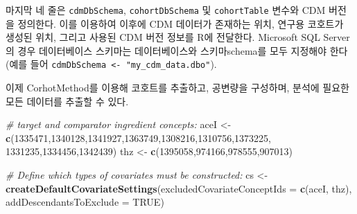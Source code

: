 \documentclass[10.5pt]{book}
\newenvironment{Shaded}{\begin{snugshade}}{\end{snugshade}}
\newcommand{\KeywordTok}[1]{\textcolor[rgb]{0.13,0.29,0.53}{\textbf{#1}}}
\newcommand{\DataTypeTok}[1]{\textcolor[rgb]{0.13,0.29,0.53}{#1}}
\newcommand{\DecValTok}[1]{\textcolor[rgb]{0.00,0.00,0.81}{#1}}
\newcommand{\StringTok}[1]{\textcolor[rgb]{0.31,0.60,0.02}{#1}}
\newcommand{\CommentTok}[1]{\textcolor[rgb]{0.56,0.35,0.01}{\textit{#1}}}
\newcommand{\OtherTok}[1]{\textcolor[rgb]{0.56,0.35,0.01}{#1}}
\newcommand{\NormalTok}[1]{#1}
\theoremstyle{definition}
\theoremstyle{definition}
\theoremstyle{definition}
\theoremstyle{remark}
\begin{document}
마지막 네 줄은 \texttt{cdmDbSchema}, \texttt{cohortDbSchema} 및
\texttt{cohortTable} 변수와 CDM 버전을 정의한다. 이를 이용하여 이후에
CDM 데이터가 존재하는 위치, 연구용 코호트가 생성된 위치, 그리고 사용된
CDM 버전 정보를 R에 전달한다. Microsoft SQL Server의 경우 데이터베이스
스키마는 데이터베이스와 스키마schema를 모두 지정해야 한다 (예를 들어
\texttt{cdmDbSchema\ \textless{}-\ "my\_cdm\_data.dbo"}).

이제 CorhotMethod를 이용해 코호트를 추출하고, 공변량을 구성하며, 분석에
필요한 모든 데이터를 추출할 수 있다.

\begin{Shaded}
\begin{Highlighting}[]
\CommentTok{# target and comparator ingredient concepts:}
\NormalTok{aceI <-}\StringTok{ }\KeywordTok{c}\NormalTok{(}\DecValTok{1335471}\NormalTok{,}\DecValTok{1340128}\NormalTok{,}\DecValTok{1341927}\NormalTok{,}\DecValTok{1363749}\NormalTok{,}\DecValTok{1308216}\NormalTok{,}\DecValTok{1310756}\NormalTok{,}\DecValTok{1373225}\NormalTok{,}
          \DecValTok{1331235}\NormalTok{,}\DecValTok{1334456}\NormalTok{,}\DecValTok{1342439}\NormalTok{)}
\NormalTok{thz <-}\StringTok{ }\KeywordTok{c}\NormalTok{(}\DecValTok{1395058}\NormalTok{,}\DecValTok{974166}\NormalTok{,}\DecValTok{978555}\NormalTok{,}\DecValTok{907013}\NormalTok{)}

\CommentTok{# Define which types of covariates must be constructed:}
\NormalTok{cs <-}\StringTok{ }\KeywordTok{createDefaultCovariateSettings}\NormalTok{(}\DataTypeTok{excludedCovariateConceptIds =} \KeywordTok{c}\NormalTok{(aceI,}
\NormalTok{                                                                     thz),}
                                     \DataTypeTok{addDescendantsToExclude =} \OtherTok{TRUE}\NormalTok{)}


\end{Highlighting}
\end{Shaded}
\end{document}
